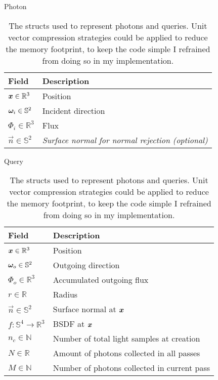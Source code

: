 \begin{table}
    \centering
    \begin{subtable}{.45\textwidth}
        \caption{Photon}
        \label{tab:photon_struct}
        \begin{tabular}{l p{4cm}}
            \textbf{Field} & \textbf{Description} \\
            \midrule
            $\bm{x} \in \mathbb{R}^3$ & Position \\
            ${\bm{\omega}_i} \in \mathbb{S}^2$ & Incident direction \\
            $\Phi_i \in \mathbb{R}^3$ & Flux \\
            $\vec{n} \in \mathbb{S}^2$ & \emph{Surface normal for normal rejection (optional)} \\
        \end{tabular}
    \end{subtable}%
    \begin{subtable}{.55\textwidth}
        \caption{Query}
        \label{tab:query_struct}
        \begin{tabular}{l p{5.5cm}}
            \textbf{Field} & \textbf{Description} \\
            \midrule
            $\bm{x} \in \mathbb{R}^3$ & Position \\
            ${\bm{\omega}_o} \in \mathbb{S}^2$ & Outgoing direction \\
            $\Phi_o \in \mathbb{R}^3$ & Accumulated outgoing flux \\
            $r \in \mathbb{R}$ & Radius \\
            $\vec{n} \in \mathbb{S}^2$ & Surface normal at $\bm{x}$ \\
            $f : \mathbb{S}^4 \to \mathbb{R}^3$ & BSDF at $\bm{x}$ \\
            $n_c \in \mathbb{N}$ & Number of total light samples at creation \\
            $N \in \mathbb{R}$ & Amount of photons collected in all passes \\
            $M \in \mathbb{N}$ & Number of photons collected in current pass \\
        \end{tabular}
    \end{subtable}
    \caption{The structs used to represent photons and queries. Unit vector compression strategies  could be applied to reduce the memory footprint, to keep the code simple I refrained from doing so in my implementation.}
\end{table}

